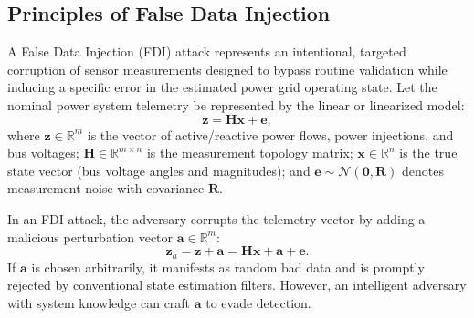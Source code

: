 \documentclass[12pt,a4paper]{report}
\begin{document}
\subsection{Principles of False Data Injection}
A False Data Injection (FDI) attack represents an intentional, targeted corruption of
sensor measurements designed to bypass routine validation while inducing a specific error
in the estimated power grid operating state. Let the nominal power system telemetry be
represented by the linear or linearized model:
\begin{equation}
\boldsymbol{z} = \boldsymbol{H}\boldsymbol{x} + \boldsymbol{e},
\label{eq:fdi_clean_model}
\end{equation}
where $\boldsymbol{z} \in \mathbb{R}^m$ is the vector of active/reactive power flows,
power injections, and bus voltages; $\boldsymbol{H} \in \mathbb{R}^{m \times n}$ is the
measurement topology matrix; $\boldsymbol{x} \in \mathbb{R}^n$ is the true state vector
(bus voltage angles and magnitudes); and $\boldsymbol{e} \sim \mathcal{N}(\boldsymbol{0}, \boldsymbol{R})$
denotes measurement noise with covariance $\boldsymbol{R}$.

In an FDI attack, the adversary corrupts the telemetry vector by adding a malicious
perturbation vector $\boldsymbol{a} \in \mathbb{R}^m$:
\begin{equation}
\boldsymbol{z}_a = \boldsymbol{z} + \boldsymbol{a} = \boldsymbol{H}\boldsymbol{x} + \boldsymbol{a} + \boldsymbol{e}.
\label{eq:fdi_attacked_model}
\end{equation}
If $\boldsymbol{a}$ is chosen arbitrarily, it manifests as random bad data and is promptly
rejected by conventional state estimation filters. However, an intelligent adversary
with system knowledge can craft $\boldsymbol{a}$ to evade detection.
\end{document}
